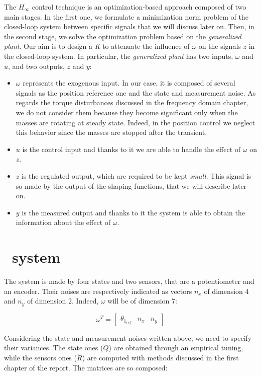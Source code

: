 The ${H_{\infty}}$ control technique is an optimization-based approach composed of two main stages. In the first one, we formulate a minimization norm problem of the closed-loop system between specific signals that we will discuss later on. Then, in the second stage, we solve the optimization problem based on the \textit{generalized plant}.
\newline
Our aim is to design a \textit{K} to attenuate the influence of $\omega$ on the signals $z$ in the closed-loop system. In particular, the \textit{generalized plant} has two inputs, $\omega$ and $u$, and two outputs, $z$ and $y$:
\begin{itemize}
	\item \boldmath$\omega$ represents the exogenous input. In our case, it is composed of several signals as the position reference one and the state and measurement noise. As regards the torque disturbances discussed in the frequency domain chapter, we do not consider them because they become significant only when the masses are rotating at steady state. Indeed, in the position control we neglect this behavior since the masses are stopped after the transient.
	\item \boldmath$u$ is the control input and thanks to it we are able to handle the effect of $\omega$ on $z$.
	\item \boldmath$z$ is the regulated output, which are required to be kept \textit{small}. This signal is so made by the output of the shaping functions, that we will describe later on.
	\item \boldmath$y$ is the measured output and thanks to it the system is able to obtain the information about the effect of $\omega$.
\end{itemize}

\section{\onedof\ system}
The system is made by four states and two sensors, that are a potentiometer and an encoder. Their noises are respectively indicated as vectors $n_x$ of dimension 4 and $n_y$ of dimension 2. Indeed, $\omega$ will be of dimension 7:

\begin{equation}
	\omega^{T} =
	\begin{bmatrix}
		\theta_{1_{ref}} & n_x & n_y
	\end{bmatrix}
\end{equation}

Considering the state and measurement noises written above, we need to specify their variances. The state ones ($\tilde{Q}$) are obtained through an empirical tuning, while the sensors ones ($\tilde{R}$) are computed with methods discussed in the first chapter of the report. The matrices are so composed:

